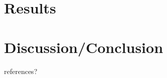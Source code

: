 \documentclass{article}
\begin{document}
	
	
	
	
	
	\section{Results}
	
	
	
	\section{Discussion/Conclusion}

\begin{figure}[h!]
	
		\begin{center}
		\end{center}
	\end{figure}
	
references?
\end{document}
